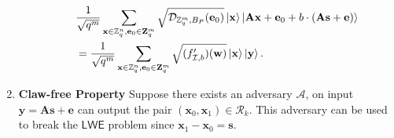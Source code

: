 \documentclass[cryptography,review,submit,pdftex,moreauthors,amsmath,amssymb,aps,strict]{Definitions/mdpi}
\begin{document}
\begin{Definition}
\begin{enumerate}
\begin{itemize}
\begin{align}
            &\frac{1}{\sqrt{q^m}}\sum_{\mathbf{x}\in\mathbb{Z}^n_q,\mathbf{e}_0\in\mathbf{Z}^m_q} \sqrt{\mathcal{D}_{\mathbb{Z}^m_q,B_P}(\mathbf{e}_0)}\ket{\mathbf{x}}\ket{\mathbf{A}\mathbf{x}+\mathbf{e}_0+b\cdot (\mathbf{A}\mathbf{s}+\mathbf{e})}\\
            &=\frac{1}{\sqrt{q^m}}\sum_{\mathbf{x}\in\mathbb{Z}^n_q,\mathbf{e}_0\in\mathbf{Z}^m_q} \sqrt{(f_{\mathcal{I},b}')(\mathbf{w})}\ket{\mathbf{x}}\ket{\mathbf{y}}.
            \label{eq:LWEtcfqstate}
        \end{align}
        
    \end{itemize}
     
    \item \textbf{Claw-free Property} Suppose there exists an adversary $\mathcal{A}$, on input $\mathbf{y}=\mathbf{A}\mathbf{s}+\mathbf{e}$ can output the pair $(\mathbf{x}_0,\mathbf{x}_1)\in\mathcal{R}_k$. This adversary can be used to break the $\mathsf{LWE}$ problem since $\mathbf{x}_1-\mathbf{x}_0=\mathbf{s}$.
    
\end{enumerate}
\end{Definition}
\end{document}

